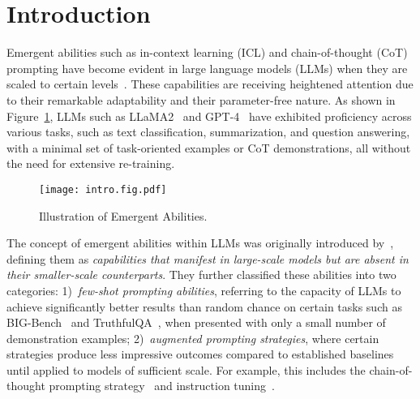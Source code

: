 \documentclass[11pt,a4paper]{article}
\begin{document}
\section{Introduction}
Emergent abilities such as in-context learning (ICL) and chain-of-thought (CoT) prompting have become evident in large language models (LLMs) when they are scaled to certain levels~\cite{Wei2022EmergentAO}.
These capabilities are receiving heightened attention due to their remarkable adaptability and their parameter-free nature.
As shown in Figure~\ref{fig:intro}, LLMs such as LLaMA2~\cite{Touvron2023Llama2O} and GPT-4~\cite{OpenAI2023GPT4TR} have exhibited proficiency across various tasks, such as text classification, summarization, and question answering, with a minimal set of task-oriented examples or CoT demonstrations, all without the need for extensive re-training.
\begin{figure}
	\centering
	{\texttt{[image: intro.fig.pdf]}\label{vis(architure)}}
	\caption{Illustration of Emergent Abilities.}
 \label{fig:intro}
\end{figure}

The concept of emergent abilities within LLMs was originally introduced by~\citet{Wei2022EmergentAO}, defining them as \textit{capabilities that manifest in large-scale models but are absent in their smaller-scale counterparts}.
They further classified these abilities into two categories: 1)~\textit{few-shot prompting abilities}, referring to the capacity of LLMs to achieve significantly better results than random chance on certain tasks such as BIG-Bench~\cite{Srivastava2022BeyondTI} and TruthfulQA~\cite{Lin2021TruthfulQAMH}, when presented with only a small number of demonstration examples; %
2)~\textit{augmented prompting strategies}, where certain strategies produce less impressive outcomes compared to established baselines until applied to models of sufficient scale.
For example, this includes the chain-of-thought prompting strategy~\cite{Wei2022ChainOT,Suzgun2022ChallengingBT} and instruction tuning~\cite{Brown2020LanguageMA, Wei2021FinetunedLM,Chung2022ScalingIL}.
\end{document}
